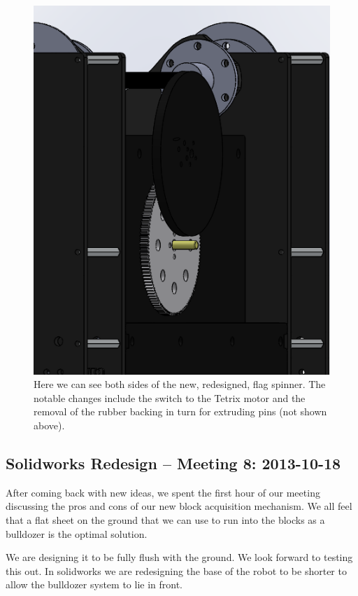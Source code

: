 \begin{figure}[H]
\begin{center}
\includegraphics[scale=0.5]{images/FlagSpinnerV2Front.png}
\end{center}
\caption{Here we can see both sides of the new, redesigned, flag spinner. The notable changes include the switch to the Tetrix motor and the removal of the rubber backing in turn for extruding pins (not shown above).}
\end{figure}

\newpage \subsection{Solidworks Redesign -- Meeting 8: 2013-10-18}
After coming back with new ideas, we spent the first hour of our meeting discussing the pros and cons of our new block acquisition mechanism. We all feel that a flat sheet on the ground that we can use to run into the blocks as a bulldozer is the optimal solution. 

We are designing it to be fully flush with the ground. We look forward to testing this out. In solidworks we are redesigning the base of the robot to be shorter to allow the bulldozer system to lie in front. 

